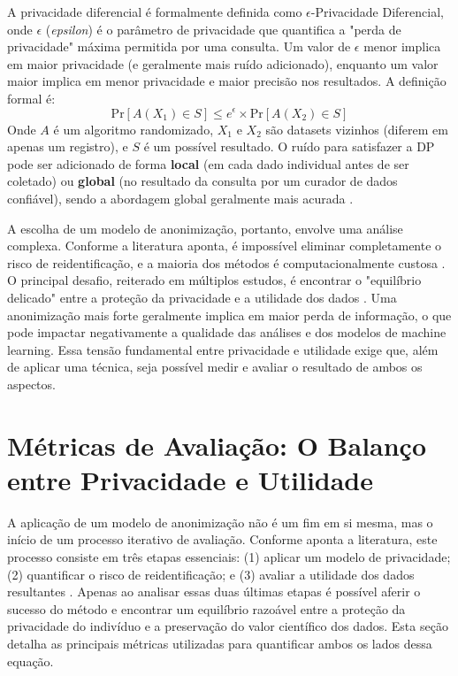 A privacidade diferencial é formalmente definida como $\epsilon$-Privacidade Diferencial, onde $\epsilon$ (\textit{epsilon}) é o parâmetro de privacidade que quantifica a "perda de privacidade" máxima permitida por uma consulta. Um valor de $\epsilon$ menor implica em maior privacidade (e geralmente mais ruído adicionado), enquanto um valor maior implica em menor privacidade e maior precisão nos resultados. A definição formal é:
$$\text{Pr}[A(X_1) \in S] \leq e^{\epsilon} \times \text{Pr}[A(X_2) \in S]$$
Onde $A$ é um algoritmo randomizado, $X_1$ e $X_2$ são datasets vizinhos (diferem em apenas um registro), e $S$ é um possível resultado. O ruído para satisfazer a DP pode ser adicionado de forma \textbf{local} (em cada dado individual antes de ser coletado) ou \textbf{global} (no resultado da consulta por um curador de dados confiável), sendo a abordagem global geralmente mais acurada \cite{Olatunji2024}.

A escolha de um modelo de anonimização, portanto, envolve uma análise complexa. Conforme a literatura aponta, é impossível eliminar completamente o risco de reidentificação, e a maioria dos métodos é computacionalmente custosa \cite{Sepas2022}. O principal desafio, reiterado em múltiplos estudos, é encontrar o "equilíbrio delicado" entre a proteção da privacidade e a utilidade dos dados \cite{Vovk2023, Olatunji2024}. Uma anonimização mais forte geralmente implica em maior perda de informação, o que pode impactar negativamente a qualidade das análises e dos modelos de machine learning. Essa tensão fundamental entre privacidade e utilidade exige que, além de aplicar uma técnica, seja possível medir e avaliar o resultado de ambos os aspectos.

\section{Métricas de Avaliação: O Balanço entre Privacidade e Utilidade}
\label{sec:fund-metricas}

A aplicação de um modelo de anonimização não é um fim em si mesma, mas o início de um processo iterativo de avaliação. Conforme aponta a literatura, este processo consiste em três etapas essenciais: (1) aplicar um modelo de privacidade; (2) quantificar o risco de reidentificação; e (3) avaliar a utilidade dos dados resultantes \cite{Ferrao2022}. Apenas ao analisar essas duas últimas etapas é possível aferir o sucesso do método e encontrar um equilíbrio razoável entre a proteção da privacidade do indivíduo e a preservação do valor científico dos dados. Esta seção detalha as principais métricas utilizadas para quantificar ambos os lados dessa equação.

